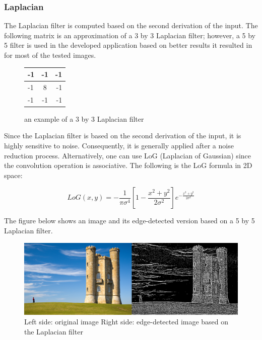 \documentclass{article}
\begin{document}
		
		\subsubsection{Laplacian}
			The Laplacian filter is computed based on the second derivation of the input. The following matrix is an approximation of a 3 by 3 Laplacian filter; however, a 5 by 5 filter is used in the developed application based on better results it resulted in for
most of the tested images.

\begin{figure}[H]
	\begin{center}
  \begin{tabular}{ | l | c | r | }
    \hline
    -1 & -1 & -1 \\ \hline
    -1 & 8 & -1 \\ \hline
    -1 & -1 & -1 \\
    \hline
  \end{tabular}
\end{center}
\caption{an example of a 3 by 3 Laplacian filter}\end{figure}


			 Since the Laplacian filter is based on the second derivation of the input, it is highly sensitive to noise. Consequently,
			it is generally applied after a noise reduction process. Alternatively, one can use LoG (Laplacian of Gaussian) since the convolution operation is
			associative. The following is the LoG formula in 2D space:

\begin{equation}
			LoG(x,y) = -\frac{1}{\pi\sigma^{4}}[1-\frac{x^{2}+y^{2}}{2\sigma^{2}}]e^{-\frac{x^{2}+y^{2}}{2\sigma^{2}}}
\end{equation}

			The figure below shows an image and its edge-detected version based on a 5 by 5 Laplacian filter.
	\begin{figure} [H]
		\centering
		\includegraphics[scale=0.3]{images/edged}
		\caption{Left side: original image Right side: edge-detected image based on the Laplacian filter \label{crop_1}}
	\end{figure}
\end{document}
